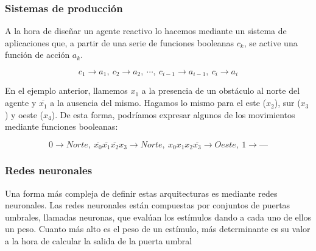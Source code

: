 \subsubsection{Sistemas de producción}

A la hora de diseñar un agente reactivo lo hacemos mediante un sistema de aplicaciones que, a partir de una serie de funciones booleanas $c_k$, se active una función de acción $a_k$.

\[c_1\rightarrow a_1,\ c_2\rightarrow a_2,\ \cdots,\ c_{i-1}\rightarrow a_{i-1},\ c_i\rightarrow a_i\]

En el ejemplo anterior, llamemos $x_1$ a la presencia de un obstáculo al norte del agente y $\overline{x_1}$ a la ausencia del mismo.
Hagamos lo mismo para el este ($x_2$), sur ($x_3$) y oeste ($x_4$).
De esta forma, podríamos expresar algunos de los movimientos mediante funciones booleanas:

\[0\rightarrow Norte,\ \overline{x_0}\overline{x_1}\overline{x_2}x_3\rightarrow Norte,\ x_0x_1x_2\overline{x_3}\rightarrow Oeste,\ 1\rightarrow \text{---}\]

\subsubsection{Redes neuronales}

Una forma más compleja de definir estas arquitecturas es mediante redes neuronales.
Las redes neuronales están compuestas por conjuntos de puertas umbrales, llamadas neuronas, que evalúan los estímulos dando a cada uno de ellos un peso.
Cuanto más alto es el peso de un estímulo, más determinante es su valor a la hora de calcular la salida de la puerta umbral


